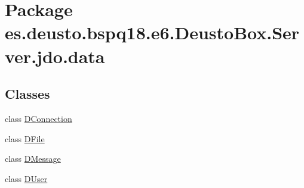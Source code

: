 \hypertarget{namespacees_1_1deusto_1_1bspq18_1_1e6_1_1_deusto_box_1_1_server_1_1jdo_1_1data}{}\section{Package es.\+deusto.\+bspq18.\+e6.\+Deusto\+Box.\+Server.\+jdo.\+data}
\label{namespacees_1_1deusto_1_1bspq18_1_1e6_1_1_deusto_box_1_1_server_1_1jdo_1_1data}
\subsection*{Classes}
\begin{DoxyCompactItemize}
\item 
class \mbox{\hyperlink{classes_1_1deusto_1_1bspq18_1_1e6_1_1_deusto_box_1_1_server_1_1jdo_1_1data_1_1_d_connection}{D\+Connection}}
\item 
class \mbox{\hyperlink{classes_1_1deusto_1_1bspq18_1_1e6_1_1_deusto_box_1_1_server_1_1jdo_1_1data_1_1_d_file}{D\+File}}
\item 
class \mbox{\hyperlink{classes_1_1deusto_1_1bspq18_1_1e6_1_1_deusto_box_1_1_server_1_1jdo_1_1data_1_1_d_message}{D\+Message}}
\item 
class \mbox{\hyperlink{classes_1_1deusto_1_1bspq18_1_1e6_1_1_deusto_box_1_1_server_1_1jdo_1_1data_1_1_d_user}{D\+User}}
\end{DoxyCompactItemize}
